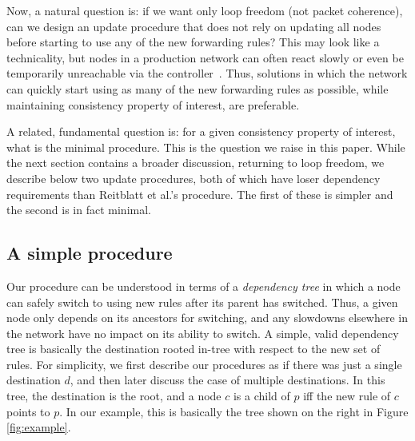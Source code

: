 Now, a natural question is: if we want only loop freedom (not packet coherence), can we design an update procedure that does not rely on updating all nodes before starting to use any of the new forwarding rules?  This may look like a technicality, but nodes in a production network can often react slowly or even be temporarily unreachable via the controller~\cite{b4}.  Thus, solutions in which the network can quickly start using as many of the new forwarding rules as possible, while maintaining consistency property of interest, are preferable.

A related, fundamental question is: for a given consistency property of interest, what is the minimal procedure. This is the question we raise in this paper. While the next section contains a broader discussion, returning to loop freedom, we describe below two update procedures, both of which have loser dependency requirements than Reitblatt et al.'s procedure.  The first of these is simpler and the second is in fact minimal.



\subsection{A simple procedure}


Our procedure can be understood in terms of a {\em dependency tree} in which a node can safely switch to using new rules after its parent has switched. Thus, a given node only depends on its ancestors for switching, and any slowdowns elsewhere in the network have no impact on its ability to switch. A simple, valid dependency tree is basically the destination rooted in-tree with respect to the new set of rules. For simplicity, we first describe our procedures as if there was just a single destination $d$, and then later discuss the case of multiple destinations. In this tree, the destination is the root, and a node $c$ is a child of $p$ iff the new rule of $c$ points to $p$. In our example, this is basically the tree shown on the right in Figure \ref{fig:example}.

